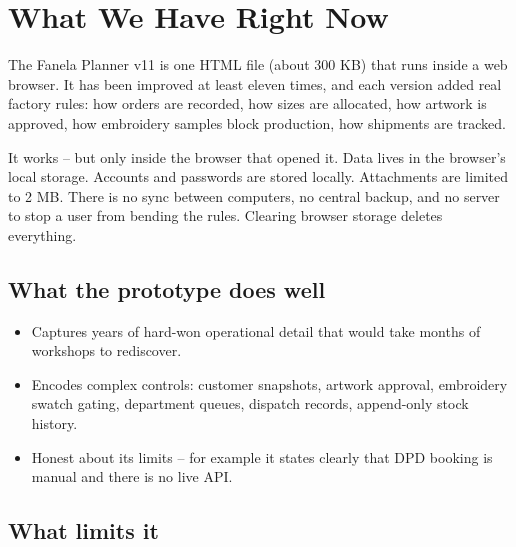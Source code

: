 \section{What We Have Right Now}\label{sec:current}

\begin{plainwords}
The Fanela Planner v11 is one HTML file (about 300 KB) that runs inside a web browser.
It has been improved at least eleven times, and each version added real factory rules:
how orders are recorded, how sizes are allocated, how artwork is approved, how embroidery
samples block production, how shipments are tracked.

It works -- but only inside the browser that opened it. Data lives in the browser's local
storage. Accounts and passwords are stored locally. Attachments are limited to 2 MB.
There is no sync between computers, no central backup, and no server to stop a user from
bending the rules. Clearing browser storage deletes everything.
\end{plainwords}

\subsection*{What the prototype does well}

\begin{itemize}
  \item Captures years of hard-won operational detail that would take months of workshops
        to rediscover.
  \item Encodes complex controls: customer snapshots, artwork approval, embroidery swatch
        gating, department queues, dispatch records, append-only stock history.
  \item Honest about its limits -- for example it states clearly that DPD booking is
        manual and there is no live API.
\end{itemize}

\subsection*{What limits it}

